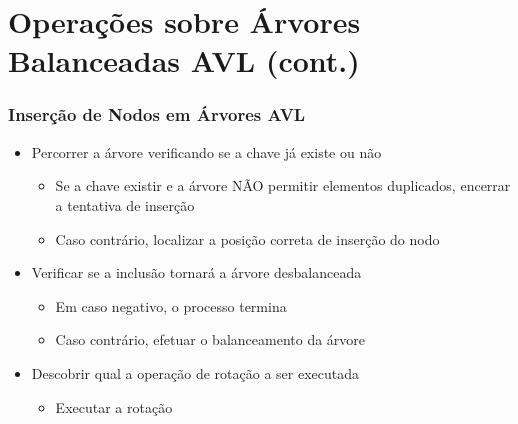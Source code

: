 \documentclass[aspectratio=169]{beamer}
\begin{document}
\section{Operações sobre Árvores Balanceadas AVL (cont.)}

\begin{frame}\frametitle{Inserção de Nodos em Árvores AVL}
\begin{itemize}
	\item Percorrer a árvore verificando se a chave já existe ou não
	\begin{itemize}
		\item Se a chave existir e a árvore NÃO permitir elementos duplicados, encerrar a tentativa de inserção
		\item Caso contrário, localizar a posição correta de inserção do nodo
	\end{itemize}
	\item Verificar se a inclusão tornará a árvore desbalanceada
	\begin{itemize}
		\item Em caso negativo, o processo termina
		\item Caso contrário, efetuar o balanceamento da árvore
	\end{itemize}
	\item Descobrir qual a operação de rotação a ser executada
	\begin{itemize}
		\item Executar a rotação
	\end{itemize}
\end{itemize}
\end{frame}
\end{document}
